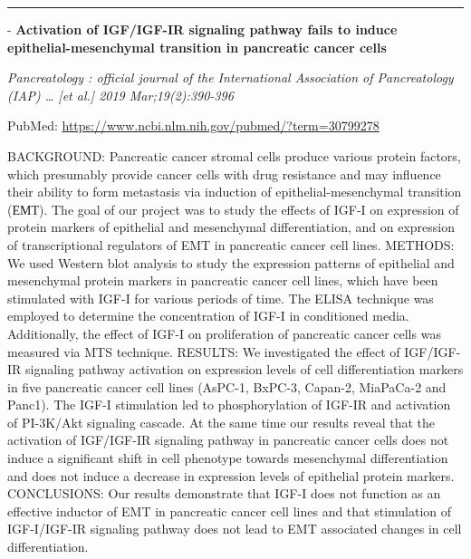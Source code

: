 \documentclass[]{article}
\begin{document}
{}

{}

\begin{center}\rule{0.5\linewidth}{\linethickness}\end{center}

 - \textbf{Activation of IGF/IGF-IR signaling pathway fails to induce
epithelial-mesenchymal transition in pancreatic cancer cells}

\emph{Pancreatology : official journal of the International Association
of Pancreatology (IAP) \ldots{} {[}et al.{]} 2019 Mar;19(2):390-396}

PubMed: \url{https://www.ncbi.nlm.nih.gov/pubmed/?term=30799278}

BACKGROUND: Pancreatic cancer stromal cells produce various protein
factors, which presumably provide cancer cells with drug resistance and
may influence their ability to form metastasis via induction of
epithelial-mesenchymal transition (ЕМТ). The goal of our project was to
study the effects of IGF-I on expression of protein markers of
epithelial and mesenchymal differentiation, and on expression of
transcriptional regulators of EMT in pancreatic cancer cell lines.
METHODS: We used Western blot analysis to study the expression patterns
of epithelial and mesenchymal protein markers in pancreatic cancer cell
lines, which have been stimulated with IGF-I for various periods of
time. The ELISA technique was employed to determine the concentration of
IGF-I in conditioned media. Additionally, the effect of IGF-I on
proliferation of pancreatic cancer cells was measured via MTS technique.
RESULTS: We investigated the effect of IGF/IGF-IR signaling pathway
activation on expression levels of cell differentiation markers in five
pancreatic cancer cell lines (AsPC-1, BxPC-3, Capan-2, MiaPaCa-2 and
Panc1). The IGF-I stimulation led to phosphorylation of IGF-IR and
activation of PI-3K/Akt signaling cascade. At the same time our results
reveal that the activation of IGF/IGF-IR signaling pathway in pancreatic
cancer cells does not induce a significant shift in cell phenotype
towards mesenchymal differentiation and does not induce a decrease in
expression levels of epithelial protein markers. CONCLUSIONS: Our
results demonstrate that IGF-I does not function as an effective
inductor of EMT in pancreatic cancer cell lines and that stimulation of
IGF-I/IGF-IR signaling pathway does not lead to EMT associated changes
in cell differentiation.

{}

{}
\end{document}
